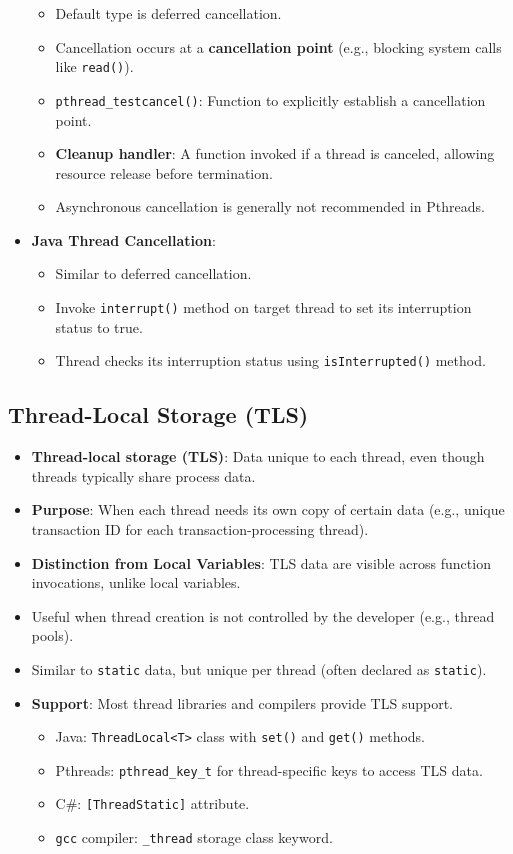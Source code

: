 \begin{itemize}
\begin{itemize}
            \item Default type is deferred cancellation.
            \item Cancellation occurs at a \textbf{cancellation point} (e.g., blocking system calls like \texttt{read()}).
            \item \texttt{pthread\_testcancel()}: Function to explicitly establish a cancellation point.
            \item \textbf{Cleanup handler}: A function invoked if a thread is canceled, allowing resource release before termination.
            \item Asynchronous cancellation is generally not recommended in Pthreads.
        \end{itemize}
    \item \textbf{Java Thread Cancellation}:
        \begin{itemize}
            \item Similar to deferred cancellation.
            \item Invoke \texttt{interrupt()} method on target thread to set its interruption status to true.
            \item Thread checks its interruption status using \texttt{isInterrupted()} method.
        \end{itemize}
\end{itemize}

\subsection{Thread-Local Storage (TLS)}
\begin{itemize}
    \item \textbf{Thread-local storage (TLS)}: Data unique to each thread, even though threads typically share process data.
    \item \textbf{Purpose}: When each thread needs its own copy of certain data (e.g., unique transaction ID for each transaction-processing thread).
    \item \textbf{Distinction from Local Variables}: TLS data are visible across function invocations, unlike local variables.
    \item Useful when thread creation is not controlled by the developer (e.g., thread pools).
    \item Similar to \texttt{static} data, but unique per thread (often declared as \texttt{static}).
    \item \textbf{Support}: Most thread libraries and compilers provide TLS support.
        \begin{itemize}
            \item Java: \texttt{ThreadLocal<T>} class with \texttt{set()} and \texttt{get()} methods.
            \item Pthreads: \texttt{pthread\_key\_t} for thread-specific keys to access TLS data.
            \item C\#: \texttt{[ThreadStatic]} attribute.
            \item \texttt{gcc} compiler: \texttt{\_thread} storage class keyword.
        \end{itemize}
\end{itemize}

